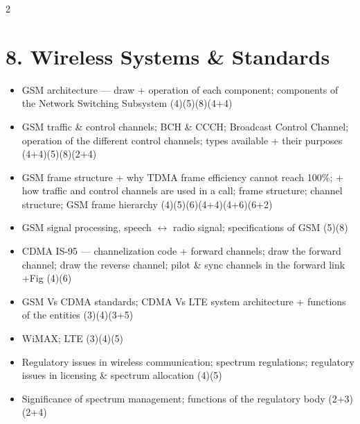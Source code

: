 \documentclass[10pt]{article}
\begin{document}
\begin{multicols}{2}
\section*{8. Wireless Systems \& Standards}
\begin{itemize}
  \item GSM architecture --- draw + operation of each component; components of the Network Switching Subsystem \hfill (4)(5)(8)(4+4)
  \item GSM traffic \& control channels; BCH \& CCCH; Broadcast Control Channel; operation of the different control channels; types available + their purposes \hfill (4+4)(5)(8)(2+4)
  \item GSM frame structure + why TDMA frame efficiency cannot reach 100\%; + how traffic and control channels are used in a call; frame structure; channel structure; GSM frame hierarchy \hfill (4)(5)(6)(4+4)(4+6)(6+2)
  \item GSM signal processing, speech $\leftrightarrow$ radio signal; specifications of GSM \hfill (5)(8)
  \item CDMA IS-95 --- channelization code + forward channels; draw the forward channel; draw the reverse channel; pilot \& sync channels in the forward link +Fig \hfill (4)(6)
  \item GSM Vs CDMA standards; CDMA Vs LTE system architecture + functions of the entities \hfill (3)(4)(3+5)
  \item WiMAX; LTE \hfill (3)(4)(5)
  \item Regulatory issues in wireless communication; spectrum regulations; regulatory issues in licensing \& spectrum allocation \hfill (4)(5)
  \item Significance of spectrum management; functions of the regulatory body \hfill (2+3)(2+4)
\end{itemize}

\end{multicols}
\end{document}
